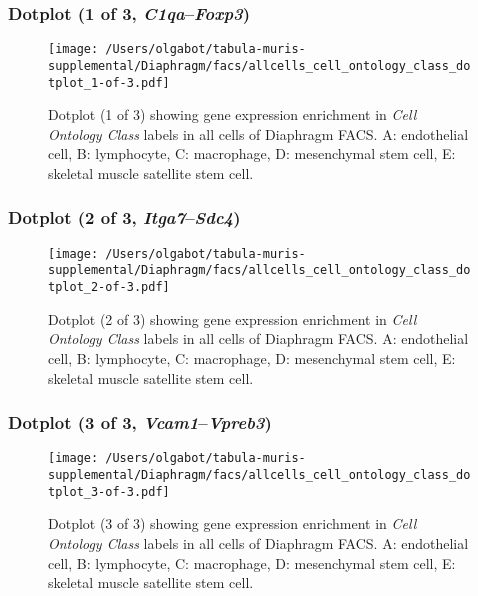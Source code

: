 \subsubsection{Dotplot (1 of 3, \emph{C1qa}--\emph{Foxp3})}
\begin{figure}[h]
\centering
\texttt{[image: /Users/olgabot/tabula-muris-supplemental/Diaphragm/facs/allcells\_cell\_ontology\_class\_dotplot\_1-of-3.pdf]}

\caption{ Dotplot (1 of 3)  showing gene expression enrichment in \emph{Cell Ontology Class} labels in all cells of Diaphragm FACS. A: endothelial cell, B: lymphocyte, C: macrophage, D: mesenchymal stem cell, E: skeletal muscle satellite stem cell.}
\end{figure}


\clearpage

\subsubsection{Dotplot (2 of 3, \emph{Itga7}--\emph{Sdc4})}
\begin{figure}[h]
\centering
\texttt{[image: /Users/olgabot/tabula-muris-supplemental/Diaphragm/facs/allcells\_cell\_ontology\_class\_dotplot\_2-of-3.pdf]}

\caption{ Dotplot (2 of 3)  showing gene expression enrichment in \emph{Cell Ontology Class} labels in all cells of Diaphragm FACS. A: endothelial cell, B: lymphocyte, C: macrophage, D: mesenchymal stem cell, E: skeletal muscle satellite stem cell.}
\end{figure}


\clearpage

\subsubsection{Dotplot (3 of 3, \emph{Vcam1}--\emph{Vpreb3})}
\begin{figure}[h]
\centering
\texttt{[image: /Users/olgabot/tabula-muris-supplemental/Diaphragm/facs/allcells\_cell\_ontology\_class\_dotplot\_3-of-3.pdf]}

\caption{ Dotplot (3 of 3)  showing gene expression enrichment in \emph{Cell Ontology Class} labels in all cells of Diaphragm FACS. A: endothelial cell, B: lymphocyte, C: macrophage, D: mesenchymal stem cell, E: skeletal muscle satellite stem cell.}
\end{figure}


\clearpage

